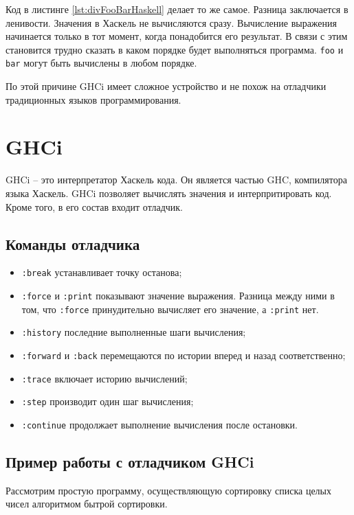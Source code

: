 \documentclass[fontsize=14pt, paper=a4, pagesize, DIV=calc]{scrartcl}
\def\code#1{\texttt{#1}}
\begin{document}
Код в листинге \ref{lst:divFooBarHaskell} делает то же самое. Разница
заключается в ленивости. Значения в Хаскель не вычисляются сразу. Вычисление
выражения начинается только в тот момент, когда понадобится его результат. В
связи с этим становится трудно сказать в каком порядке будет выполняться
программа. \code{foo} и \code{bar} могут быть вычислены в любом порядке.

По этой причине GHCi имеет сложное устройство и не похож на отладчики
традиционных языков программирования.

\section{GHCi}

GHCi -- это интерпретатор Хаскель кода. Он является частью GHC, компилятора
языка Хаскель. GHCi позволяет вычислять значения и интерпритировать код. Кроме
того, в его состав входит отладчик.

\subsection{Команды отладчика}

\begin{itemize}
\item \code{:break} устанавливает точку останова;
\item \code{:force} и \code{:print} показывают значение выражения. Разница между ними в
том, что \code{:force} принудительно вычисляет его значение, а \code{:print} нет.
\item \code{:history} последние выполненные шаги вычисления;
\item \code{:forward} и \code{:back} перемещаются по истории вперед и назад
соответственно;
\item \code{:trace} включает историю вычислений;
\item \code{:step} производит один шаг вычисления;
\item \code{:continue} продолжает выполнение вычисления после остановки.
\end{itemize}

\subsection{Пример работы с отладчиком GHCi}

Рассмотрим простую программу, осуществляющую сортировку списка целых чисел
алгоритмом бытрой сортировки.
\end{document}
